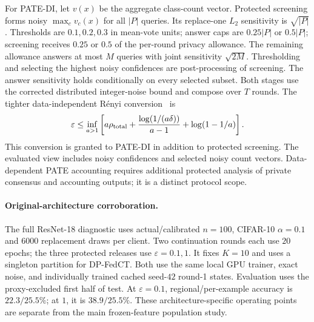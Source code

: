 For PATE-DI, let $v(x)$ be the aggregate class-count vector.
Protected screening forms noisy $\max_c v_c(x)$ for all $|P|$ queries.
Its replace-one $L_2$ sensitivity is $\sqrt{|P|}$.
Thresholds are $0.1,0.2,0.3$ in mean-vote units; answer caps are
$0.25|P|$ or $0.5|P|$; screening receives $0.25$ or $0.5$ of the per-round
privacy allowance. The remaining allowance answers at most $M$ queries with
joint sensitivity $\sqrt{2M}$. Thresholding and selecting the highest noisy
confidences are post-processing of screening. The answer sensitivity holds
conditionally on every selected subset. Both stages use the corrected
distributed integer-noise bound and compose over $T$ rounds.
The tighter data-independent R\'enyi conversion~\cite{balle2020hypothesis} is
\begin{equation}
\varepsilon\le\inf_{a>1}\left[
a\rho_{\rm total}+\frac{\log(1/(a\delta))}{a-1}
+\log(1-1/a)\right].
\end{equation}
This conversion is granted to PATE-DI in addition to protected screening.
The evaluated view includes noisy confidences and selected noisy count vectors.
Data-dependent PATE accounting requires additional protected analysis of
private consensus and accounting outputs; it is a distinct protocol scope.

\paragraph{Original-architecture corroboration.}
The full ResNet-18 diagnostic uses actual/calibrated $n=100$, CIFAR-10
$\alpha=0.1$ and $6000$ replacement draws per client. Two continuation
rounds each use $20$ epochs; the three protected releases use
$\varepsilon=0.1,1$. It fixes $K=10$ and uses a singleton partition
for DP-FedCT. Both use the same local GPU trainer, exact noise, and individually trained cached seed-$42$ round-1 states. Evaluation uses the proxy-excluded first
half of test. At $\varepsilon=0.1$, regional/per-example accuracy is $22.3/25.5\%$;
at $1$, it is $38.9/25.5\%$. These architecture-specific operating points
are separate from the main frozen-feature population study.

